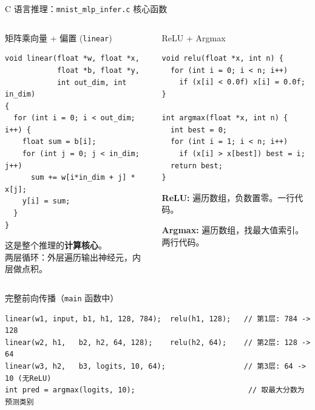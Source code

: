 \documentclass[aspectratio=169]{ctexbeamer}
\begin{document}
\begin{frame}[fragile,shrink=29]{C 语言推理：\texttt{mnist\_mlp\_infer.c} 核心函数}
\footnotesize

\begin{columns}[T]
\begin{block}{矩阵乘向量 + 偏置 (\texttt{linear})}
\begin{lstlisting}[basicstyle=\ttfamily\footnotesize, frame=none, numbers=none, backgroundcolor=\color{codebg}]
void linear(float *w, float *x,
            float *b, float *y,
            int out_dim, int in_dim)
{
  for (int i = 0; i < out_dim; i++) {
    float sum = b[i];
    for (int j = 0; j < in_dim; j++)
      sum += w[i*in_dim + j] * x[j];
    y[i] = sum;
  }
}
\end{lstlisting}
这是整个推理的\textbf{计算核心}。\\
两层循环：外层遍历输出神经元，内层做点积。
\end{block}

\begin{block}{ReLU + Argmax}
\begin{lstlisting}[basicstyle=\ttfamily\footnotesize, frame=none, numbers=none, backgroundcolor=\color{codebg}]
void relu(float *x, int n) {
  for (int i = 0; i < n; i++)
    if (x[i] < 0.0f) x[i] = 0.0f;
}

int argmax(float *x, int n) {
  int best = 0;
  for (int i = 1; i < n; i++)
    if (x[i] > x[best]) best = i;
  return best;
}
\end{lstlisting}
\textbf{ReLU:} 遍历数组，负数置零。一行代码。

\textbf{Argmax:} 遍历数组，找最大值索引。两行代码。
\end{block}
\end{columns}

\vspace{0.15cm}

\begin{block}{完整前向传播（\texttt{main} 函数中）}
\begin{lstlisting}[basicstyle=\ttfamily\small, frame=none, numbers=none, backgroundcolor=\color{codebg}]
linear(w1, input, b1, h1, 128, 784);  relu(h1, 128);   // 第1层: 784 -> 128
linear(w2, h1,   b2, h2, 64, 128);    relu(h2, 64);    // 第2层: 128 -> 64
linear(w3, h2,   b3, logits, 10, 64);                  // 第3层: 64 -> 10 (无ReLU)
int pred = argmax(logits, 10);                          // 取最大分数为预测类别
\end{lstlisting}
\end{block}
\end{frame}
\end{document}
